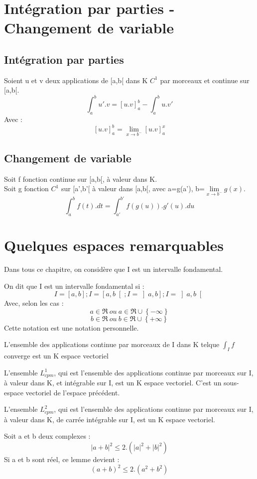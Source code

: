 \section{Intégration par parties - Changement de variable}
\subsection{Intégration par parties}
\begin{de}
Soient u et v deux applications de [a,b[ dans K $C^1$ par morceaux et continue sur [a,b[. 
$$\int_a^b u'.v = \left[u.v\right]_a^b - \int_a^b u.v' $$
Avec : 
$$\left[u.v\right]_a^b = \lim_{x \rightarrow b^-} \left[u.v\right]_a^x$$
\end{de}
\subsection{Changement de variable}
Soit f fonction continue sur [a,b[, à valeur dans K.\\
Soit g fonction $C^1$ sur [a',b'[ à valeur dans [a,b[, avec a=g(a'), b=$\underset{x\rightarrow b^-}\lim g(x)$.\\
$$\int_a^b f(t).dt = \int_{a'}^{b'} f(g(u)).g'(u).du$$
\section{Quelques espaces remarquables}
Dans tous ce chapitre, on considère que I est un intervalle fondamental.
\begin{de}
On dit que I est un intervalle fondamental si : 
$$I = \left[a,b\right] ; I = \left[a,b\right[ ; I = \left]a,b\right] ; I = \left]a,b\right[ $$
Avec, selon les cas :
$$a \in \Re~ ou~ a \in \Re\cup\left\lbrace-\infty\right\rbrace $$
$$b \in \Re~ ou~ b \in \Re\cup\left\lbrace+\infty\right\rbrace $$
Cette notation est une notation personnelle.
\end{de}
\begin{prop}
L'ensemble des applications continue par morceaux de I dans K telque $\int_I f$ converge est un K espace vectoriel
\end{prop}
\begin{prop}
L'ensemble $L^1_{cpm}$, qui est l'ensemble des applications continue par morceaux sur I, à valeur dans K, et intégrable sur I, est un K espace vectoriel. C'est un sous-espace vectoriel de l'espace précédent.
\end{prop}
\begin{prop}
L'ensemble $L^2_{cpm}$, qui est l'ensemble des applications continue par morceaux sur I, à valeur dans K, de carrée intégrable sur I, est un K espace vectoriel.
\end{prop}
\begin{lemme}
Soit a et b deux complexes : 
$$|a+b|^2 \leq 2.(|a|^2 + |b|^2)$$
Si a et b sont réel, ce lemme devient : 
$$(a+b)^2 \leq 2.(a^2 + b^2)$$
\end{lemme}
